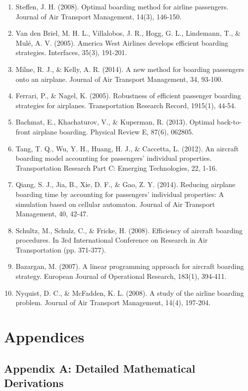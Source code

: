 \begin{enumerate}
    \item Steffen, J. H. (2008). Optimal boarding method for airline passengers. Journal of Air Transport Management, 14(3), 146-150.
    \item Van den Briel, M. H. L., Villalobos, J. R., Hogg, G. L., Lindemann, T., \& Mulé, A. V. (2005). America West Airlines develops efficient boarding strategies. Interfaces, 35(3), 191-201.
    \item Milne, R. J., \& Kelly, A. R. (2014). A new method for boarding passengers onto an airplane. Journal of Air Transport Management, 34, 93-100.
    \item Ferrari, P., \& Nagel, K. (2005). Robustness of efficient passenger boarding strategies for airplanes. Transportation Research Record, 1915(1), 44-54.
    \item Bachmat, E., Khachaturov, V., \& Kuperman, R. (2013). Optimal back-to-front airplane boarding. Physical Review E, 87(6), 062805.
    \item Tang, T. Q., Wu, Y. H., Huang, H. J., \& Caccetta, L. (2012). An aircraft boarding model accounting for passengers' individual properties. Transportation Research Part C: Emerging Technologies, 22, 1-16.
    \item Qiang, S. J., Jia, B., Xie, D. F., \& Gao, Z. Y. (2014). Reducing airplane boarding time by accounting for passengers' individual properties: A simulation based on cellular automaton. Journal of Air Transport Management, 40, 42-47.
    \item Schultz, M., Schulz, C., \& Fricke, H. (2008). Efficiency of aircraft boarding procedures. In 3rd International Conference on Research in Air Transportation (pp. 371-377).
    \item Bazargan, M. (2007). A linear programming approach for aircraft boarding strategy. European Journal of Operational Research, 183(1), 394-411.
    \item Nyquist, D. C., \& McFadden, K. L. (2008). A study of the airline boarding problem. Journal of Air Transport Management, 14(4), 197-204.
\end{enumerate}

\section{Appendices}
\subsection{Appendix A: Detailed Mathematical Derivations}

